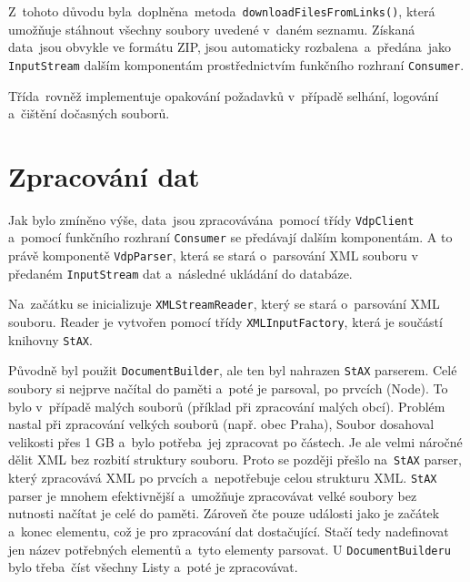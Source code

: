 Z~tohoto důvodu byla~doplněna~metoda~\texttt{downloadFilesFromLinks()}, která umožňuje stáhnout všechny soubory uvedené v~daném seznamu.  
Získaná data~jsou obvykle ve formátu ZIP, jsou automaticky rozbalena~a~předána~jako \texttt{InputStream} dalším komponentám  
prostřednictvím funkčního rozhraní \texttt{Consumer}.  

Třída~rovněž implementuje opakování požadavků v~případě selhání, logování a~čištění dočasných souborů.

\section{Zpracování dat}
Jak bylo zmíněno výše, data~jsou zpracovávána~pomocí třídy \texttt{VdpClient} 
a~pomocí funkčního rozhraní \texttt{Consumer} se předávají dalším komponentám.
A to právě komponentě \texttt{VdpParser}, která se stará o~parsování XML souboru v předaném \texttt{InputStream} 
dat a~následné ukládání do databáze.

Na~začátku se inicializuje \texttt{XMLStreamReader}, který se stará o~parsování XML souboru. 
Reader je vytvořen pomocí třídy \texttt{XMLInputFactory}, která je součástí \\ knihovny \texttt{StAX}.

Původně byl použit \texttt{DocumentBuilder}, ale ten byl nahrazen \texttt{StAX} parserem.
Celé soubory si nejprve načítal do paměti a~poté je parsoval, po prvcích (Node).
To bylo v~případě malých souborů (příklad při zpracování malých obcí). 
Problém nastal při zpracování velkých souborů (např. obec Praha),
Soubor dosahoval velikosti přes 1 GB a~bylo potřeba~jej zpracovat po částech.
Je ale velmi náročné dělit XML bez rozbití struktury souboru.
Proto se později přešlo na~\texttt{StAX} parser, který zpracovává XML po prvcích a~nepotřebuje celou strukturu XML.
\texttt{StAX} parser je mnohem efektivnější a~umožňuje zpracovávat velké soubory bez nutnosti načítat je celé do paměti.
Zároveň čte pouze události jako je začátek a~konec elementu, což je pro zpracování dat dostačující.
Stačí tedy nadefinovat jen název potřebných elementů a~tyto elementy parsovat.
U \texttt{DocumentBuilderu} bylo třeba~číst všechny Listy a~poté je zpracovávat.


